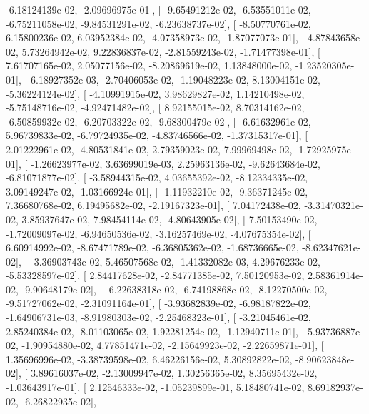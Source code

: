 \documentclass{article}
\begin{document}
         -6.18124139e-02,  -2.09696975e-01],
       [ -9.65491212e-02,  -6.53551011e-02,  -6.75211058e-02,
         -9.84531291e-02,  -6.23638737e-02],
       [ -8.50770761e-02,   6.15800236e-02,   6.03952384e-02,
         -4.07358973e-02,  -1.87077073e-01],
       [  4.87843658e-02,   5.73264942e-02,   9.22836837e-02,
         -2.81559243e-02,  -1.71477398e-01],
       [  7.61707165e-02,   2.05077156e-02,  -8.20869619e-02,
          1.13848000e-02,  -1.23520305e-01],
       [  6.18927352e-03,  -2.70406053e-02,  -1.19048223e-02,
          8.13004151e-02,  -5.36224124e-02],
       [ -4.10991915e-02,   3.98629827e-02,   1.14210498e-02,
         -5.75148716e-02,  -4.92471482e-02],
       [  8.92155015e-02,   8.70314162e-02,  -6.50859932e-02,
         -6.20703322e-02,  -9.68300479e-02],
       [ -6.61632961e-02,   5.96739833e-02,  -6.79724935e-02,
         -4.83746566e-02,  -1.37315317e-01],
       [  2.01222961e-02,  -4.80531841e-02,   2.79359023e-02,
          7.99969498e-02,  -1.72925975e-01],
       [ -1.26623977e-02,   3.63699019e-03,   2.25963136e-02,
         -9.62643684e-02,  -6.81071877e-02],
       [ -3.58944315e-02,   4.03655392e-02,  -8.12334335e-02,
          3.09149247e-02,  -1.03166924e-01],
       [ -1.11932210e-02,  -9.36371245e-02,   7.36680768e-02,
          6.19495682e-02,  -2.19167323e-01],
       [  7.04172438e-02,  -3.31470321e-02,   3.85937647e-02,
          7.98454114e-02,  -4.80643905e-02],
       [  7.50153490e-02,  -1.72009097e-02,  -6.94650536e-02,
         -3.16257469e-02,  -4.07675354e-02],
       [  6.60914992e-02,  -8.67471789e-02,  -6.36805362e-02,
         -1.68736665e-02,  -8.62347621e-02],
       [ -3.36903743e-02,   5.46507568e-02,  -1.41332082e-03,
          4.29676233e-02,  -5.53328597e-02],
       [  2.84417628e-02,  -2.84771385e-02,   7.50120953e-02,
          2.58361914e-02,  -9.90648179e-02],
       [ -6.22638318e-02,  -6.74198868e-02,  -8.12270500e-02,
         -9.51727062e-02,  -2.31091164e-01],
       [ -3.93682839e-02,  -6.98187822e-02,  -1.64906731e-03,
         -8.91980303e-02,  -2.25468323e-01],
       [ -3.21045461e-02,   2.85240384e-02,  -8.01103065e-02,
          1.92281254e-02,  -1.12940711e-01],
       [  5.93736887e-02,  -1.90954880e-02,   4.77851471e-02,
         -2.15649923e-02,  -2.22659871e-01],
       [  1.35696996e-02,  -3.38739598e-02,   6.46226156e-02,
          5.30892822e-02,  -8.90623848e-02],
       [  3.89616037e-02,  -2.13009947e-02,   1.30256365e-02,
          8.35695432e-02,  -1.03643917e-01],
       [  2.12546333e-02,  -1.05239899e-01,   5.18480741e-02,
          8.69182937e-02,  -6.26822935e-02],
\end{document}
